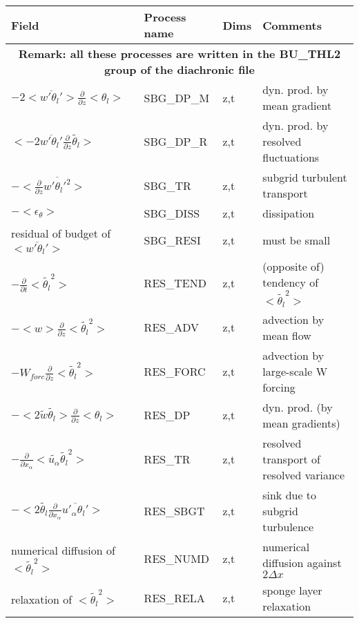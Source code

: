 \begin{longtable}[c]{|p{}|p{}|p{}|p{}|}
\hline
Field & Process name & Dims & Comments \\
\hline \hline
\endhead
\multicolumn{4}{|c|}{\textbf{Remark: all these processes are written in the BU\_THL2 group of the diachronic file}} \\
\hline
\endfoot
$- 2 <\overline{w'\theta_l'}>\frac{\partial }{\partial z}<\theta_l>$     & SBG\_DP\_M & z,t & dyn. prod. by mean gradient \\\hline
$<-2 \overline{w'\theta_l'}\frac{\partial}{\partial z}\tilde{\theta_l}>$ & SBG\_DP\_R & z,t & dyn. prod. by resolved fluctuations\\\hline
$-<\frac{\partial}{\partial z}\overline{w'\theta_l'^2}>$                 & SBG\_TR    & z,t & subgrid turbulent transport\\\hline
$-<\epsilon_\theta>$                                                     & SBG\_DISS  & z,t & dissipation \\\hline
{\rm residual of budget of} $<\overline{w'\theta_l'}>$                   & SBG\_RESI  & z,t & must be small \\\hline
$-\frac{\partial }{\partial t}<\tilde{\theta_l}^2>$                      & RES\_TEND  & z,t & (opposite of) tendency of $<\tilde{\theta_l}^2>$\\\hline
$-<w>\frac{\partial}{\partial z}<\tilde{\theta_l}^2>$                    & RES\_ADV   & z,t & advection by mean flow \\\hline
$-W_{forc}\frac{\partial}{\partial z}<\tilde{\theta_l}^2>$               & RES\_FORC  & z,t & advection by large-scale W forcing \\\hline
$-< 2 \tilde{w}\tilde{\theta_l}>\frac{\partial }{\partial z}<\theta_l>$  & RES\_DP    & z,t & dyn. prod. (by mean gradients) \\\hline
$-\frac{\partial}{\partial x_\alpha} <\tilde{u_\alpha} \tilde{\theta_l}^2>$ & RES\_TR & z,t & resolved transport of resolved variance \\\hline
$- <2 \tilde{\theta_l}\frac{\partial}{\partial x_\alpha}\overline{u'_\alpha \theta_l'}>$ & RES\_SBGT & z,t & sink due to subgrid turbulence \\\hline
{\rm numerical diffusion of } $<\tilde{\theta_l}^2>$                     & RES\_NUMD  & z,t & numerical diffusion against $2\Delta x$ \\\hline
{\rm relaxation of }$<\tilde{\theta_l}^2>$                               & RES\_RELA  & z,t & sponge layer relaxation \\\hline

\end{longtable}
